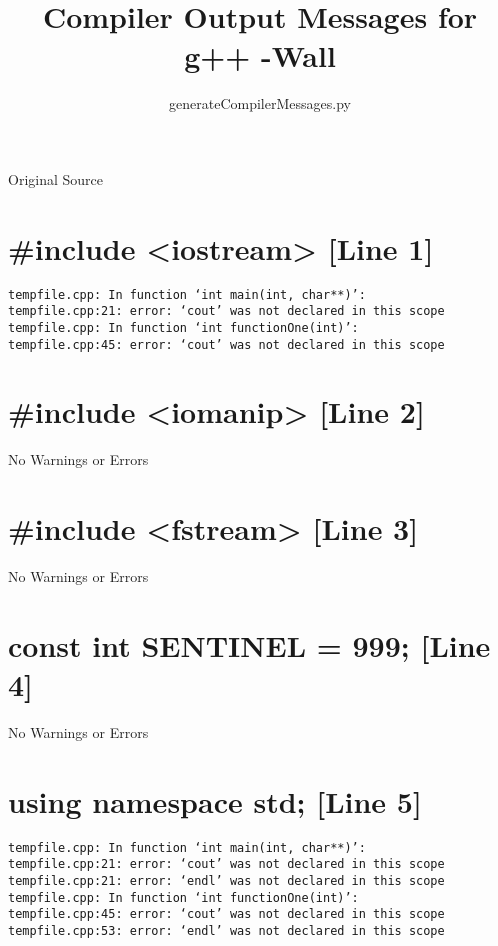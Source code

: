 \documentclass{article}
\author{generateCompilerMessages.py}
\title{Compiler Output Messages for g++ -Wall}
\begin{document}
\maketitle
\tableofcontents
\newpage
		
\begin{center}
\large{Original Source}
\end{center}
\lstset{numbers=left}

\newpage
\section{\#include <iostream> [Line 1]}
\begin{verbatim}
tempfile.cpp: In function ‘int main(int, char**)’:
tempfile.cpp:21: error: ‘cout’ was not declared in this scope
tempfile.cpp: In function ‘int functionOne(int)’:
tempfile.cpp:45: error: ‘cout’ was not declared in this scope

\end{verbatim}



\section{\#include <iomanip> [Line 2]}
No Warnings or Errors



\section{\#include <fstream> [Line 3]}
No Warnings or Errors



\section{const int SENTINEL = 999; [Line 4]}
No Warnings or Errors



\section{using namespace std; [Line 5]}
\begin{verbatim}
tempfile.cpp: In function ‘int main(int, char**)’:
tempfile.cpp:21: error: ‘cout’ was not declared in this scope
tempfile.cpp:21: error: ‘endl’ was not declared in this scope
tempfile.cpp: In function ‘int functionOne(int)’:
tempfile.cpp:45: error: ‘cout’ was not declared in this scope
tempfile.cpp:53: error: ‘endl’ was not declared in this scope

\end{verbatim}
\end{document}
